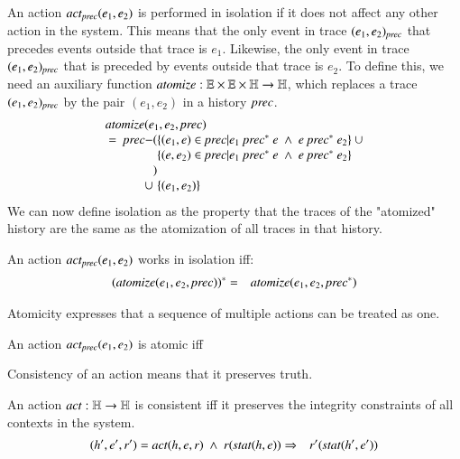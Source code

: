 \documentclass{elsarticle}
\def\id#1{\text{\it #1\/}}
\begin{document}
	An action $\id{act}_\id{prec}(e_1,e_2)$ is performed in isolation if it does not affect any other action in the system.
	This means that the only event in trace $(e_1,e_2)_\id{prec}$ that precedes events outside that trace is $e_1$.
	Likewise, the only event in trace $(e_1,e_2)_\id{prec}$ that is preceded by events outside that trace is $e_2$.
	To define this, we need an auxiliary function
	$\id{atomize}:\mathbb E\times\mathbb E\times\mathbb H\rightarrow\mathbb H$,
	which replaces a trace $(e_1,e_2)_\id{prec}$ by the pair $(e_1,e_2)$
	in a history $\id{prec}$.
\begin{eqnarray}
	\begin{array}[t]{r@{}l@{}l}
	\multicolumn{3}{l}{\id{atomize}(e_1,e_2,\id{prec})}\\
	   \ =\ \id{prec}-&(&\{ (e_1,e)\in\id{prec}| e_1\ \id{prec}^*\ e\ \wedge\ e\ \id{prec}^*\ e_2\}\ \cup\\
			  & &\{ (e,e_2)\in\id{prec}| e_1\ \id{prec}^*\ e\ \wedge\ e\ \id{prec}^*\ e_2\}\\
			  &)\\
		\cup&&\{ (e_1,e_2) \}\\
	\end{array}
\end{eqnarray}
	We can now define isolation as the property that the traces of the "atomized" history
	are the same as the atomization of all traces in that history.
\begin{definition}[Isolation]
\item An action $\id{act}_\id{prec}(e_1,e_2)$ works in isolation iff:
\label{def:Isolation}
\begin{eqnarray}
	(\id{atomize}(e_1,e_2,\id{prec}))^*&=&\id{atomize}(e_1,e_2,\id{prec}^*)
\end{eqnarray}
\end{definition}

	Atomicity expresses that a sequence of multiple actions can be treated as one.

\begin{definition}[Atomic]
\item An action $\id{act}_\id{prec}(e_1,e_2)$ is atomic iff
\label{def:Atomicity}
\end{definition}

	Consistency of an action means that it preserves truth.
\begin{definition}[Consistency]
\item An action $\id{act}:\mathbb H\rightarrow\mathbb H$ is consistent iff it preserves the integrity constraints of all contexts in the system.
\label{def:Consistency}
\begin{eqnarray}
	(h',e',r')=\id{act}(h,e,r)\ \wedge\ r(\id{stat}(h,e))&\Rightarrow&r'(\id{stat}(h',e'))
\end{eqnarray}
\end{definition}
\end{document}
